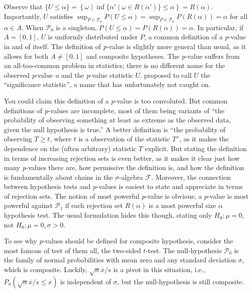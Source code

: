 Observe that $\{U\leq\alpha\}=\left\{ \omega\mid\inf\{\alpha'\mid\omega\in R(\alpha')\}\leq\alpha\right\}=R(\alpha)$.
Importantly, $U$ satisfies $\sup_{P\in\mathcal{P}_{0}}P(U\leq\alpha)=\sup_{P\in\mathcal{P}_{0}}P(R(\alpha))=\alpha$
for all $\alpha\in A$. When $\mathcal{P}_{0}$ is a singleton, $P(U\leq\alpha)=P(R(\alpha))=\alpha$.
In particular, if $A=[0,1]$, $U$ is uniformly distributed under
$P$, a common definition of a \emph{p}-value in and of itself. The definition
of \emph{p}-value is slightly more general than usual, as it allows
for both $A\neq[0,1]$ and composite hypotheses. The \emph{p}-value
suffers from an all-too-common problem in statistics; there is no
different name for the observed \emph{p}-value $u$ and the \emph{p}-value
statistic $U$. \textcite{Schweder1988-nh} proposed to call $U$ the
``significance statistic'', a name that has unfortunately not caught
on. 

You could claim this definition of a \emph{p}-value is too convoluted.
But common definitions of\emph{ p}-values are incomplete, most of
them being variants of ``the probability of observing something at
least as extreme as the observed data, given the null hypothesis is
true.'' A better definition is ``the probability of observing $T\geq t$,
where $t$ is a observation of the statistic $T$'', as it makes
the dependence on the (often arbitrary) statistic $T$ explicit. But
stating the definition in terms of increasing rejection sets is even better,
as it makes it clear just how many \emph{p}-values there are, how
permissive the definition is, and how the definition is fundamentally
about chains in the $\sigma$-algebra $\mathcal{F}$. Moreover, the
connection between hypothesis tests and \emph{p}-values is easiest to state
and appreciate in terms of rejection sets. The notion of most powerful
\emph{p}-value is obvious; a \emph{p}-value is most powerful against
$\mathcal{P}_{1}$ if each rejection set $R(\alpha)$ is a most powerful
size $\alpha$ hypothesis test. The usual formulation hides this though, stating only $H_0:\mu = 0$, not $H_0:\mu=0,\sigma>0$.

To see why \emph{p}-values should be defined for composite hypothesis,
consider the most famous of test of them all, the two-sided $t$-test.
The null-hypothesis $\mathcal{P}_{0}$ is the family of normal probabilities
with mean zero and any standard deviation $\sigma$, which is composite.
Luckily, $\sqrt{n}\overline{x}/s$ is a pivot in this situation, i.e.,
$P_{\sigma}(\sqrt{n}\overline{x}/s\leq x)$ is independent of $\sigma$,
but the null-hypothesis is still composite. 

